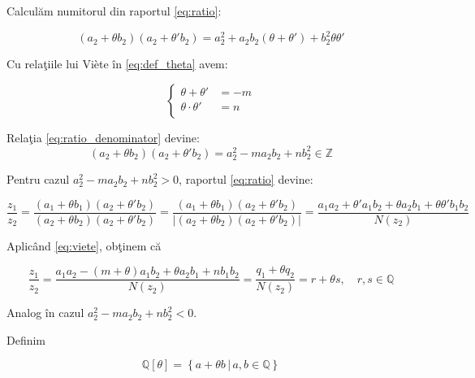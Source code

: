 \documentclass[12pt]{article}
\begin{document}
Calculăm numitorul din raportul \eqref{eq:ratio}:

\begin{equation} \label{eq:ratio_denominator}
    (a_2 + \theta b_2)(a_2 + \theta' b_2) = a_2^2 + a_2b_2(\theta + \theta') + b_2^2\theta\theta'
\end{equation}

Cu relaţiile lui Viète în \eqref{eq:def_theta} avem:

\begin{equation} \label{eq:viete}
    \begin{cases}
    \theta + \theta' &= -m \\
    \theta \cdot \theta' &= n \\
    \end{cases}
\end{equation}

Relaţia \eqref{eq:ratio_denominator} devine:
\begin{equation}
    (a_2 + \theta b_2)(a_2 + \theta' b_2) = a_2^2 - m a_2 b_2 + n b_2^2 \in \mathbb{Z}
\end{equation}

Pentru cazul $a_2^2 - m a_2 b_2 + n b_2^2 > 0$, raportul \eqref{eq:ratio} devine:

\begin{equation} \label{eq:ratio_a}
    \frac{z_1}{z_2} = \frac{(a_1 + \theta b_1)(a_2 + \theta' b_2)}{(a_2 + \theta b_2)(a_2 + \theta' b_2)} 
    =  \frac{(a_1 + \theta b_1)(a_2 + \theta' b_2)}{|(a_2 + \theta b_2)(a_2 + \theta' b_2)|} 
    = \frac{a_1 a_2 + \theta' a_1 b_2 + \theta a_2 b_1 + \theta \theta' b_1b_2}{N(z_2)}
\end{equation}

Aplicând \eqref{eq:viete}, obţinem că

\begin{equation} \label{eq:ratio_a_viete}
    \frac{z_1}{z_2} =
    \frac{a_1 a_2 - (m + \theta) a_1 b_2 + \theta a_2 b_1 + n b_1b_2}{N(z_2)} =
    \frac{q_1 + \theta q_2}{N(z_2)} = 
    r + \theta s, \quad r, s \in \mathbb{Q}
\end{equation}

Analog în cazul $a_2^2 - m a_2 b_2 + n b_2^2 < 0$.

\vspace{.4cm}
Definim

\begin{equation} \label{eq:def_q_theta}
    \mathbb{Q}[\theta] = \left\{ a + \theta b \,|\, a, b \in \mathbb{Q} \right\}
\end{equation}
\end{document}
